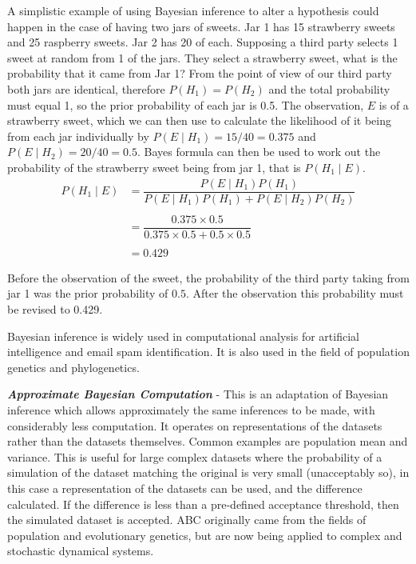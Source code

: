 A simplistic example of using Bayesian inference to alter a hypothesis could happen in the case of having two jars of sweets. Jar 1 has 15 strawberry sweets and 25 raspberry sweets. Jar 2 has 20 of each. Supposing a third party selects 1 sweet at random from 1 of the jars. They select a strawberry sweet, what is the probability that it came from Jar 1? From the point of view of our third party both jars are identical, therefore $P(H_1) = P(H_2)$ and the total probability must equal 1, so the prior probability of each jar is 0.5. The observation, $E$ is of a strawberry sweet, which we can then use to calculate the likelihood of it being from each jar individually by $P(E\mid H_1) = 15/40 = 0.375$ and $P(E\mid H_2) = 20/40 = 0.5$.
Bayes formula can then be used to work out the probability of the strawberry sweet being from jar 1, that is $P(H_1\mid E)$.\\
\begin{align}
\nonumber
P(H_1\mid E) & = \dfrac{P(E\mid H_1)P(H_1)}{P(E\mid H_1)P(H_1) + P(E\mid H_2)P(H_2)}\\
\nonumber \\
\nonumber
& = \dfrac{0.375 \times 0.5}{0.375 \times 0.5 + 0.5 \times 0.5}\\
\nonumber \\
& = 0.429
\end{align}

Before the observation of the sweet, the probability of the third party taking from jar 1 was the prior probability of $0.5$. After the observation this probability must be revised to 0.429.

Bayesian inference is widely used in computational analysis for artificial intelligence and email spam identification. It is also used in the field of population genetics and phylogenetics\cite{Ronquist2011}.

\textbf{\textit{Approximate Bayesian Computation}} - This is an adaptation of Bayesian inference which allows approximately the same inferences to be made, with considerably less computation. It operates on representations of the datasets rather than the datasets themselves. Common examples are population mean and variance. This is useful for large complex datasets where the probability of a simulation of the dataset matching the original is very small (unacceptably so), in this case a representation of the datasets can be used, and the difference calculated. If the difference is less than a pre-defined acceptance threshold, then the simulated dataset is accepted. ABC originally came from the fields of population and evolutionary genetics\cite{Beaumont2002}, but are now being applied to complex and stochastic dynamical systems\cite{Sisson2007,Toni2009,Beaumont2010}.

